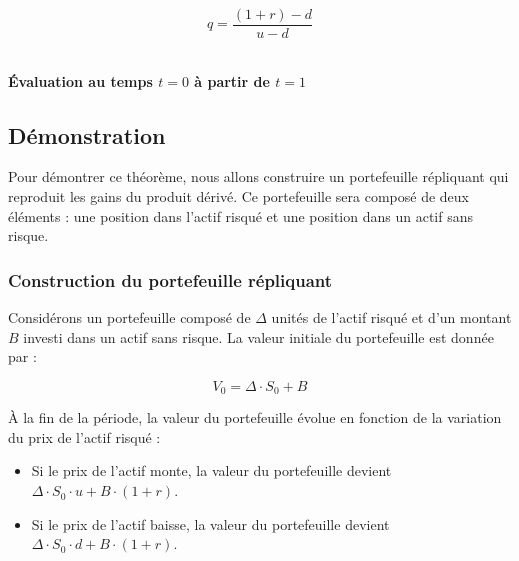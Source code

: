 \documentclass[12pt,a4paper]{article}
\begin{document}
\begin{equation}
    \boxed{q = \frac{(1 + r) - d}{u - d}}
\end{equation}

\vspace{1cm}

\begin{center}
    \\
    \textbf{Évaluation au temps $t = 0$ à partir de $t = 1$}
\end{center}

\vspace{1cm}

\subsection{Démonstration}

Pour démontrer ce théorème, nous allons construire un portefeuille répliquant qui reproduit les gains du produit dérivé. Ce portefeuille sera composé de deux éléments : une position dans l'actif risqué et une position dans un actif sans risque.

\subsubsection{Construction du portefeuille répliquant}

Considérons un portefeuille composé de \(\Delta\) unités de l'actif risqué et d'un montant \(B\) investi dans un actif sans risque. La valeur initiale du portefeuille est donnée par :

\begin{equation}
V_0 = \Delta \cdot S_0 + B
\end{equation}

À la fin de la période, la valeur du portefeuille évolue en fonction de la variation du prix de l'actif risqué :

\begin{itemize}
    \item Si le prix de l'actif monte, la valeur du portefeuille devient \(\Delta \cdot S_0 \cdot u + B \cdot (1 + r)\).
    \item Si le prix de l'actif baisse, la valeur du portefeuille devient \(\Delta \cdot S_0 \cdot d + B \cdot (1 + r)\).
\end{itemize}
\end{document}
